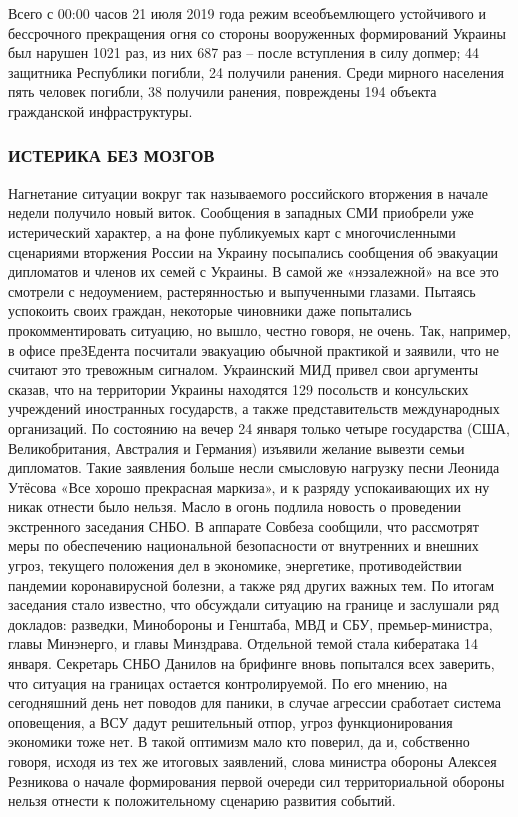 Всего с 00:00 часов 21 июля 2019 года режим всеобъемлющего устойчивого и
бессрочного прекращения огня со стороны вооруженных формирований Украины был
нарушен 1021 раз, из них 687 раз – после вступления в силу допмер; 44 защитника
Республики погибли, 24 получили ранения. Среди мирного населения пять человек
погибли, 38 получили ранения, повреждены 194 объекта гражданской
инфраструктуры.

\subsubsection{ИСТЕРИКА БЕЗ МОЗГОВ}

Нагнетание ситуации вокруг так называемого российского вторжения в начале
недели получило новый виток. Сообщения в западных СМИ приобрели уже
истерический характер, а на фоне публикуемых карт с многочисленными сценариями
вторжения России на Украину посыпались сообщения об эвакуации дипломатов и
членов их семей с Украины. В самой же «нэзалежной» на все это смотрели с
недоумением, растерянностью и выпученными глазами. Пытаясь успокоить своих
граждан, некоторые чиновники даже попытались прокомментировать ситуацию, но
вышло, честно говоря, не очень. Так, например, в офисе преЗЕдента посчитали
эвакуацию обычной практикой и заявили, что не считают это тревожным сигналом.
Украинский МИД привел свои аргументы сказав, что на территории Украины
находятся 129 посольств и консульских учреждений иностранных государств, а
также представительств международных организаций. По состоянию на вечер 24
января только четыре государства (США, Великобритания, Австралия и Германия)
изъявили желание вывезти семьи дипломатов. Такие заявления больше несли
смысловую нагрузку песни Леонида Утёсова «Все хорошо прекрасная маркиза», и к
разряду успокаивающих их ну никак отнести было нельзя. Масло в огонь подлила
новость о проведении экстренного заседания СНБО. В аппарате Совбеза сообщили,
что рассмотрят меры по обеспечению национальной безопасности от внутренних и
внешних угроз, текущего положения дел в экономике, энергетике, противодействии
пандемии коронавирусной болезни, а также ряд других важных тем. По итогам
заседания стало известно, что обсуждали ситуацию на границе и заслушали ряд
докладов: разведки, Минобороны и Генштаба, МВД и СБУ, премьер-министра, главы
Минэнерго, и главы Минздрава. Отдельной темой стала кибератака 14 января.
Секретарь СНБО Данилов на брифинге вновь попытался всех заверить, что ситуация
на границах остается контролируемой. По его мнению, на сегодняшний день нет
поводов для паники, в случае агрессии сработает система оповещения, а ВСУ дадут
решительный отпор, угроз функционирования экономики тоже нет. В такой оптимизм
мало кто поверил, да и, собственно говоря, исходя из тех же итоговых заявлений,
слова министра обороны Алексея Резникова о начале формирования первой очереди
сил территориальной обороны нельзя отнести к положительному сценарию развития
событий.

